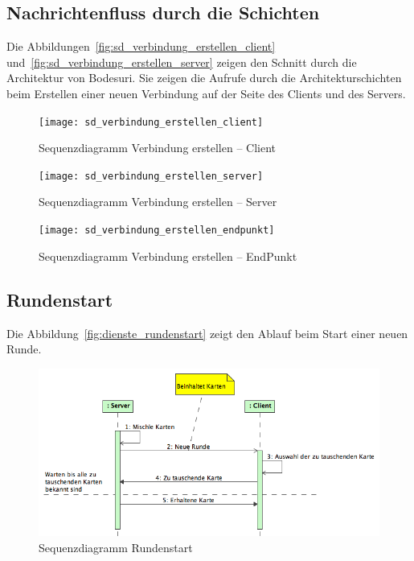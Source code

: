 \documentclass[12pt,halfparskip]{scrartcl}
\begin{document}
\subsection{Nachrichtenfluss durch die Schichten}
\label{sub:nachrichtenfluss_durch_die_schichten}
Die Abbildungen~\vref{fig:sd_verbindung_erstellen_client} und~\vref{fig:sd_verbindung_erstellen_server} zeigen den Schnitt durch die Architektur von Bodesuri. Sie zeigen die Aufrufe durch die Architekturschichten beim Erstellen einer neuen Verbindung auf der Seite des Clients und des Servers.
\begin{figure}[h]
	\centering
	\texttt{[image: sd\_verbindung\_erstellen\_client]}
	\caption{Sequenzdiagramm Verbindung erstellen -- Client}
	\label{fig:sd_verbindung_erstellen_client}
\end{figure}
\begin{figure}[h]
	\centering
	\texttt{[image: sd\_verbindung\_erstellen\_server]}
	\caption{Sequenzdiagramm Verbindung erstellen -- Server}
	\label{fig:sd_verbindung_erstellen_server}
\end{figure}

\begin{figure}[h]
	\centering
	\texttt{[image: sd\_verbindung\_erstellen\_endpunkt]}
	\caption{Sequenzdiagramm Verbindung erstellen -- EndPunkt}
	\label{fig:sd_verbindung_erstellen_endpunkt}
\end{figure}

\subsection{Rundenstart}
\label{sub:rundenstart}
Die Abbildung~\vref{fig:dienste_rundenstart} zeigt den Ablauf beim Start einer neuen Runde.
\begin{figure}[h]
	\centering
	\includegraphics[width=0.7 \textwidth]{dienste_rundenstart}
	\caption{Sequenzdiagramm Rundenstart}
	\label{fig:dienste_rundenstart}
\end{figure}

\clearpage
\end{document}
